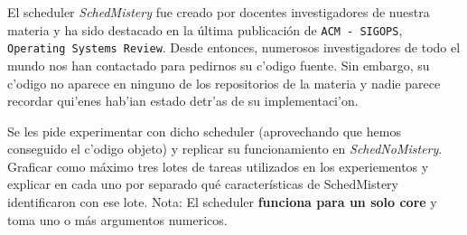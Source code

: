 \documentclass[a4paper,11pt]{article}
\begin{document}




\begin{ejercicio}
El scheduler \emph{SchedMistery} fue creado por docentes investigadores de nuestra materia y ha sido destacado en la última publicación de \texttt{ACM - SIGOPS}, \texttt{Operating Systems Review}. Desde entonces, numerosos investigadores de todo el mundo nos han contactado para pedirnos su c'odigo fuente. Sin embargo, su c'odigo no aparece en ninguno de los repositorios de la materia y nadie parece recordar qui'enes hab'ian estado detr'as de su implementaci'on.

Se les pide experimentar con dicho scheduler (aprovechando que hemos conseguido el c'odigo objeto) y replicar su funcionamiento en \emph{SchedNoMistery}. Graficar como máximo tres lotes de tareas utilizados en los experiementos y explicar en cada uno por separado qué características de SchedMistery identificaron con ese lote. Nota: El scheduler \textbf{funciona para un solo core} y toma uno o más argumentos numericos.
\end{ejercicio}
\end{document}
